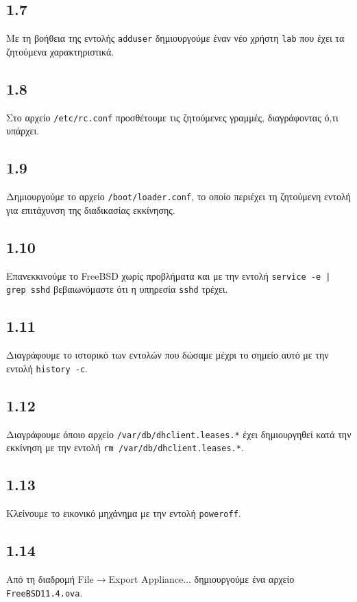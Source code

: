 \documentclass[a4paper, 12pt]{article}
\begin{document}
	\subsection*{1.7}
		Με τη βοήθεια της εντολής \verb|adduser| δημιουργούμε έναν νέο χρήστη \verb|lab| που έχει τα ζητούμενα χαρακτηριστικά.

	\subsection*{1.8}
		Στο αρχείο \verb|/etc/rc.conf| προσθέτουμε τις ζητούμενες γραμμές, διαγράφοντας ό,τι υπάρχει.

	\subsection*{1.9}
		Δημιουργούμε το αρχείο \verb|/boot/loader.conf|, το οποίο περιέχει τη ζητούμενη εντολή για επιτάχυνση της διαδικασίας εκκίνησης.

	\subsection*{1.10}
		Επανεκκινούμε το FreeBSD χωρίς προβλήματα και με την εντολή \verb+service -e | grep sshd+ βεβαιωνόμαστε ότι η υπηρεσία \verb|sshd| τρέχει.

	\subsection*{1.11}
		Διαγράφουμε το ιστορικό των εντολών που δώσαμε μέχρι το σημείο αυτό με την εντολή \verb|history -c|. 

	\subsection*{1.12}
		Διαγράφουμε όποιο αρχείο \verb|/var/db/dhclient.leases.*| έχει δημιουργηθεί κατά την εκκίνηση με την εντολή \verb|rm /var/db/dhclient.leases.*|.

	\subsection*{1.13}
		Κλείνουμε το εικονικό μηχάνημα με την εντολή \verb|poweroff|.

	\subsection*{1.14}
		Από τη διαδρομή File$\rightarrow$Export Appliance... δημιουργούμε ένα αρχείο \verb|FreeBSD11.4.ova|.
\end{document}
